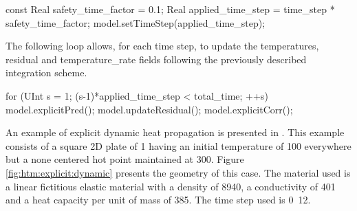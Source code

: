 \begin{cpp}
  const Real safety_time_factor = 0.1;
  Real applied_time_step = time_step * safety_time_factor;
  model.setTimeStep(applied_time_step);
\end{cpp}


The following loop  allows, for each time  step, to update the  temperatures, residual and
temperature\_rate  fields  following the previously described integration scheme.

\begin{cpp}
  for (UInt s = 1; (s-1)*applied_time_step < total_time; ++s) {
    model.explicitPred();
    model.updateResidual();
    model.explicitCorr();  
  }
\end{cpp}

An    example    of    explicit     dynamic    heat propagation is    presented    in
.  This example  consists of a square 2D plate of \unit{1}{\squaremetre} 
having an initial temperature of \unit{100}{\kelvin} everywhere but a none centered hot point 
maintained at \unit{300}{\kelvin}. Figure \ref{fig:htm:explicit:dynamic} presents the
geometry of this case. The material used is a linear fictitious elastic material
with  a density  of  \unit{8940}{\kilogrampercubicmetre}, a  conductivity of 
\unit{401}{\watt\per\metre\per\kelvin} and a heat capacity per unit of mass  of \unit{385}{\joule\per\kelvin\per\kilogram}. The time step used is \unit{0.12}{\second}.


